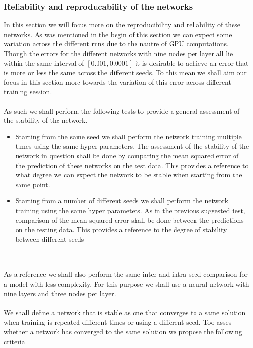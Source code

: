 \documentclass[12pt]{article}
\begin{document}
\subsubsection{Reliability and reproducability of the networks}

In this section we will focus more on the reproducibility and reliability of these networks. As was mentioned in the begin of this section we can expect some variation across the different runs due to the nautre of GPU computations. Though the errors for the different networks with nine nodes per layer all lie within the same interval of $[0.001, 0.0001]$ it is desirable to achieve an error that is more or less the same across the different seeds. To this mean we shall aim our focus in this section more towards the variation of this error across different training session.
\\
\\
As such we shall perform the following tests to provide a general assessment of the stability of the network.
\begin{itemize}
	\item Starting from the same seed we shall perform the network training multiple times using the same hyper parameters. The assessment of the stability of the network in question shall be done by comparing the mean squared error of the prediction of these networks on the test data. This provides a reference to what degree we can expect the network to be stable when starting from the same point.
	\item Starting from a number of different seeds we shall perform the network training using the same hyper parameters. As in the previous suggested test, comparison of the mean squared error shall be done between the predictions on the testing data. This provides a reference to the degree of stability between different seeds 
\end{itemize}
\\
\\
As a reference we shall also perform the same inter and intra seed comparison for a model with less complexity. For this purpose we shall use a neural network with nine layers and three nodes per layer.
\\
\\
We shall define a network that is stable as one that converges to a same solution when training is repeated different times or using a different seed. Too asses whether a network has converged to the same solution we propose the following criteria
\end{document}
